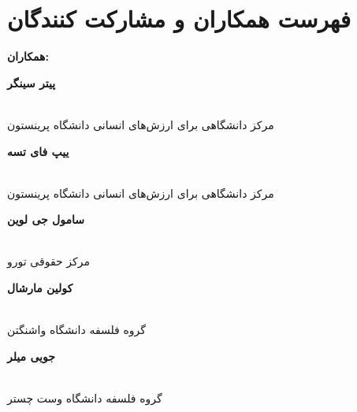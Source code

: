 
\section*{فهرست همکاران و مشارکت کنندگان}
\label{sec:فهرست همکاران و مشارکت کنندگان}

\begin{multicols}{2} %
    \begin{flushright}
        \begin{Large}
            \textbf{همکاران:}
        \end{Large}
    \end{flushright}

    \begin{flushright}
        \begin{normalsize}
            \textbf{پیتر سینگر}
        \end{normalsize}
        \\
        مرکز دانشگاهی برای ارزش‌های انسانی دانشگاه پرینستون
    \end{flushright}

    \begin{flushright}
        \begin{normalsize}
            \textbf{ییپ فای تسه}
        \end{normalsize}
        \\
        مرکز دانشگاهی برای ارزش‌های انسانی دانشگاه پرینستون
    \end{flushright}

    \begin{flushright}
        \begin{normalsize}
            \textbf{سامول جی لوین}
        \end{normalsize}
        \\
        مرکز حقوقی تورو
    \end{flushright}

    \begin{flushright}
        \begin{normalsize}
            \textbf{کولین مارشال}
        \end{normalsize}
        \\
        گروه فلسفه دانشگاه واشنگتن
    \end{flushright}

    \begin{flushright}
        \begin{normalsize}
            \textbf{جویی میلر}
        \end{normalsize}
        \\
        گروه فلسفه دانشگاه وست چستر
    \end{flushright}


\end{multicols}
